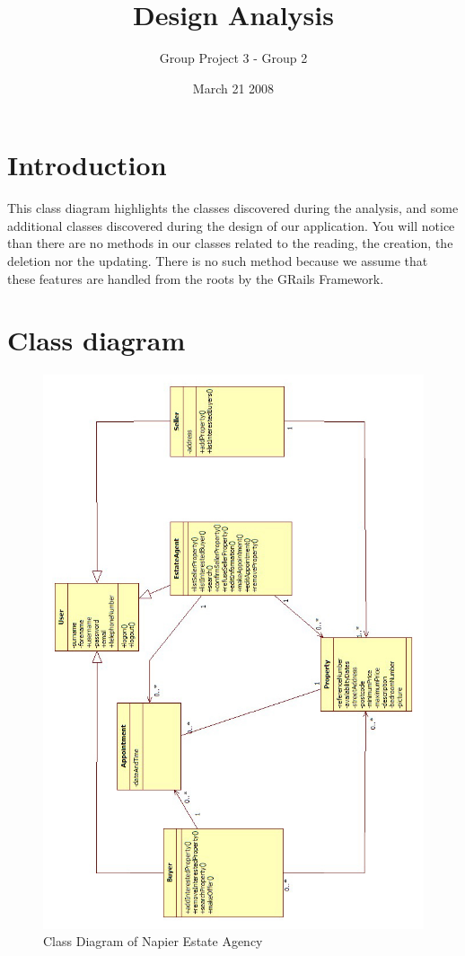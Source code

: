 \documentclass[a4paper,12pt]{article}
\title{Design Analysis}
\author{Group Project 3 - Group 2}
\date{March 21 2008}
\begin{document}
\maketitle
\newpage
\tableofcontents
\newpage



\section{Introduction}
This class diagram highlights the classes discovered during the analysis,
and some additional classes discovered during the design of our application.
You will notice than there are no methods in our classes related to the reading, the creation, the deletion nor the updating.
There is no such method because we assume that these features are handled from the roots by the GRails Framework.

\section{Class diagram}
\begin{figure}[htbp]
\begin{center}
\includegraphics[width=\linewidth]{pics/classDiagram.jpg}
\end{center}
\caption{\footnotesize Class Diagram of Napier Estate Agency}
\end{figure}
\end{document}

